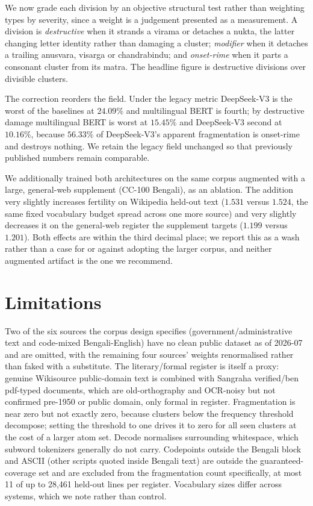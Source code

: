 \documentclass[11pt]{article}
\begin{document}
We now grade each division by an objective structural test rather than
weighting types by severity, since a weight is a judgement presented as a
measurement. A division is \emph{destructive} when it strands a virama or
detaches a nukta, the latter changing letter identity rather than damaging a
cluster; \emph{modifier} when it detaches a trailing anusvara, visarga or
chandrabindu; and \emph{onset-rime} when it parts a consonant cluster from
its matra. The headline figure is destructive divisions over divisible
clusters.

The correction reorders the field. Under the legacy metric DeepSeek-V3 is the
worst of the baselines at $24.09\%$ and multilingual BERT is fourth; by
destructive damage multilingual BERT is worst at $15.45\%$ and DeepSeek-V3
second at $10.16\%$, because $56.33\%$ of DeepSeek-V3's apparent fragmentation
is onset-rime and destroys nothing. We retain the legacy field unchanged so
that previously published numbers remain comparable.

We additionally trained both architectures on the same corpus augmented
with a large, general-web supplement (CC-100 Bengali), as an ablation. The
addition very slightly increases fertility on Wikipedia held-out text
($1.531$ versus $1.524$, the same fixed vocabulary budget spread across one
more source) and very slightly decreases it on the general-web register the
supplement targets ($1.199$ versus $1.201$). Both effects are within the
third decimal place; we report this as a wash rather than a case for or
against adopting the larger corpus, and neither augmented artifact is the
one we recommend.

\section{Limitations}
Two of the six sources the corpus design specifies (government/administrative
text and code-mixed Bengali-English) have no clean public dataset as of
2026-07 and are omitted, with the remaining four sources' weights renormalised
rather than faked with a substitute. The literary/formal register is itself a
proxy: genuine Wikisource public-domain text is combined with Sangraha
verified/ben pdf-typed documents, which are old-orthography and OCR-noisy but
not confirmed pre-1950 or public domain, only formal in register. Fragmentation
is near zero but not exactly zero, because clusters below the frequency
threshold decompose; setting the threshold to one drives it to zero for all
seen clusters at the cost of a larger atom set. Decode normalises surrounding
whitespace, which subword tokenizers generally do not carry. Codepoints outside
the Bengali block and ASCII (other scripts quoted inside Bengali text) are
outside the guaranteed-coverage set and are excluded from the fragmentation
count specifically, at most 11 of up to 28,461 held-out lines per register.
Vocabulary sizes differ across systems, which we note rather than control.
\end{document}
